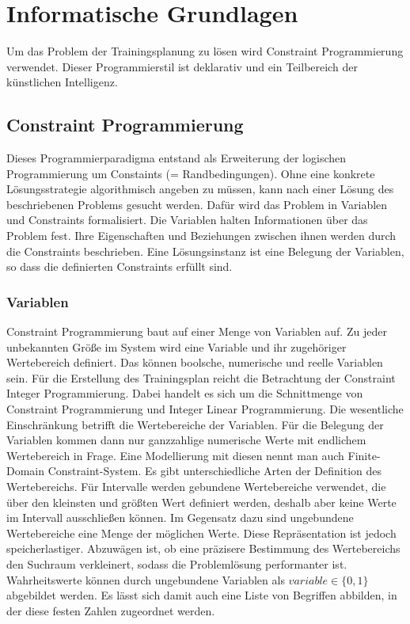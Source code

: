 \chapter{Informatische Grundlagen}
\label{sec:grundlagen:info}
Um das Problem der Trainingsplanung zu lösen wird Constraint Programmierung verwendet. Dieser Programmierstil ist deklarativ und ein Teilbereich der künstlichen Intelligenz.

\section{Constraint Programmierung}
Dieses Programmierparadigma entstand als Erweiterung der logischen Programmierung um Constaints (= Randbedingungen). Ohne eine konkrete Lösungsstrategie algorithmisch angeben zu müssen, kann nach einer Lösung des beschriebenen Problems gesucht werden. Dafür wird das Problem in Variablen und Constraints formalisiert. Die Variablen halten Informationen über das Problem fest. Ihre Eigenschaften und Beziehungen zwischen ihnen werden durch die Constraints beschrieben. Eine Lösungsinstanz ist eine Belegung der Variablen, so dass die definierten Constraints erfüllt sind. \cite{EssentialsConstraintProgrammierung, HandbookConstraintProgramming}

\subsection{Variablen}
Constraint Programmierung baut auf einer Menge von Variablen auf. Zu jeder unbekannten Größe im System wird eine Variable und ihr zugehöriger Wertebereich definiert. Das können boolsche, numerische und reelle Variablen sein.
Für die Erstellung des Trainingsplan reicht die Betrachtung der Constraint Integer Programmierung. Dabei handelt es sich um die Schnittmenge von Constraint Programmierung und Integer Linear Programmierung. Die wesentliche Einschränkung betrifft die Wertebereiche der Variablen. Für die Belegung der Variablen kommen dann nur ganzzahlige numerische Werte mit endlichem Wertebereich in Frage. Eine Modellierung mit diesen nennt man auch Finite-Domain Constraint-System. Es gibt unterschiedliche Arten der Definition des Wertebereichs. Für Intervalle werden gebundene Wertebereiche verwendet, die über den kleinsten und größten Wert definiert werden, deshalb aber keine Werte im Intervall ausschließen können. Im Gegensatz dazu sind ungebundene Wertebereiche eine Menge der möglichen Werte. Diese Repräsentation ist jedoch speicherlastiger. Abzuwägen ist, ob eine präzisere Bestimmung des Wertebereichs den Suchraum verkleinert, sodass die Problemlösung performanter ist. \newline
Wahrheitswerte können durch ungebundene Variablen als $variable \in \{0, 1\}$ abgebildet werden. Es lässt sich damit auch eine Liste von Begriffen abbilden, in der diese festen Zahlen zugeordnet werden. \cite{HandbookKnowledgeRepresentation}

